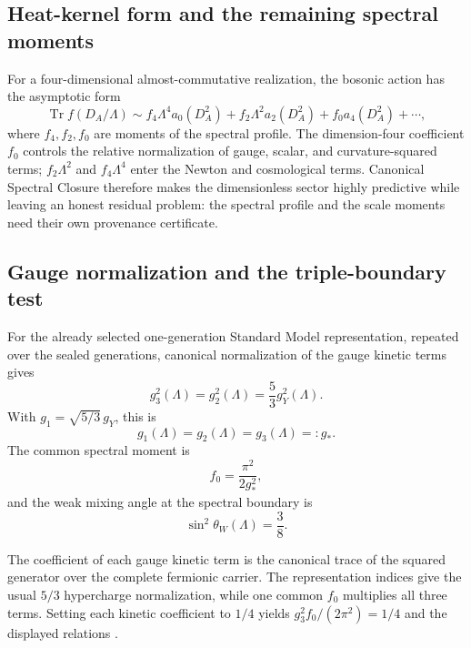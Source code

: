 \subsection{Heat-kernel form and the remaining spectral moments}

For a four-dimensional almost-commutative realization, the bosonic action has the asymptotic
form
\[
 \operatorname{Tr}f(D_A/\Lambda)
 \sim
 f_4\Lambda^4 a_0(D_A^2)
 +f_2\Lambda^2 a_2(D_A^2)
 +f_0 a_4(D_A^2)+\cdots,
\]
where $f_4,f_2,f_0$ are moments of the spectral profile.  The dimension-four coefficient
$f_0$ controls the relative normalization of gauge, scalar, and curvature-squared terms;
$f_2\Lambda^2$ and $f_4\Lambda^4$ enter the Newton and cosmological terms.  Canonical
Spectral Closure therefore makes the dimensionless sector highly predictive while leaving
an honest residual problem: the spectral profile and the scale moments need their own
provenance certificate.

\subsection{Gauge normalization and the triple-boundary test}

\begin{theorem}
\label{thm:csc-gauge-relation}
For the already selected one-generation Standard Model representation, repeated over the
sealed generations, canonical normalization of the gauge kinetic terms gives
\[
 g_3^2(\Lambda)=g_2^2(\Lambda)=\frac53 g_Y^2(\Lambda).
\]
With $g_1=\sqrt{5/3}\,g_Y$, this is
\[
 \boxed{g_1(\Lambda)=g_2(\Lambda)=g_3(\Lambda)=:g_*}.
\]
The common spectral moment is
\[
 \boxed{f_0=\frac{\pi^2}{2g_*^2}},
\]
and the weak mixing angle at the spectral boundary is
\[
 \boxed{\sin^2\theta_W(\Lambda)=\frac38}.
\]
\end{theorem}

\begin{proofsketch}
The coefficient of each gauge kinetic term is the canonical trace of the squared generator
over the complete fermionic carrier.  The representation indices give the usual
$5/3$ hypercharge normalization, while one common $f_0$ multiplies all three terms.  Setting
each kinetic coefficient to $1/4$ yields
$g_3^2f_0/(2\pi^2)=1/4$ and the displayed relations
\cite{chamseddine-connes-marcolli}.
\end{proofsketch}

